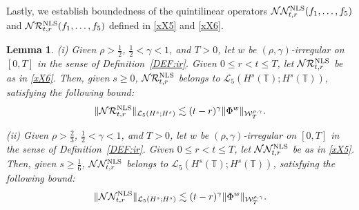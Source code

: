 \documentclass[letterpaper, 11pt,  reqno]{amsart}
\newtheorem{lemma}[theorem]{Lemma}
\newcommand{\1}{\hspace{0.5mm}\text{I}\hspace{0.5mm}}
\newcommand{\noi}{\noindent}
\newcommand{\T}{\mathbb{T}}
\renewcommand{\L}{\mathcal{L}}
\newcommand{\RR}{\mathcal{R}}
\newcommand{\g}{\gamma}
\newcommand{\les}{\lesssim}
\newcommand{\NN}{\mathcal{N}}
\newcommand{\W}{\mathcal{W}}
\newcommand{\NLS}{\text{\rm NLS} }
\numberwithin{equation}{section}
\numberwithin{theorem}{section}
\begin{document}
Lastly,  we establish boundedness of 
the quintilinear operators  
$\NN \NN^\NLS_{t, r}(f_1, \dots, f_5)$
and 
$\NN \RR^\NLS_{t, r}(f_1, \dots, f_5)$
defined in  \eqref{xX5}
and \eqref{xX6}.




\begin{lemma}\label{LEM:nonlin9}
\textup{(i)}
Given $\rho > \frac 12 $,  $\frac12< \g < 1$, and $T> 0$, 
let  $w$ be $(\rho,\g)$-irregular on $[0, T]$ in the sense of Definition~\ref{DEF:ir}.
Given $0 \le r < t \le T$, let $\NN \RR^\NLS_{t, r}$
be as in \eqref{xX6}.
Then, given  $s \ge 0$, 
$\NN \RR^\NLS_{t, r}$  belongs to $\L_5(H^s(\T); H^{s}(\T))$, 
satisfying
 the following bound\textup{:}
\begin{align}
 \|\NN \RR^\NLS_{t, r}\|_{\L_5(H^s; H^{s})}
\les 
(t- r)^\g  \|\Phi^w\|_{  \W^{\rho,\g}_T}.
\label{Xnox1c}
\end{align}




\medskip

\noi
\textup{(ii)}
Given $\rho > \frac 23 $,  $\frac12< \g < 1$, and $T> 0$, 
let  $w$ be $(\rho,\g)$-irregular on $[0, T]$ in the sense of Definition~\ref{DEF:ir}.
Given $0 \le r < t \le T$, let $\NN \NN^\NLS_{t, r}$
be as in \eqref{xX5}.
Then, given  $s \ge \frac 16$, 
$\NN \NN^\NLS_{t, r}$  belongs to $\L_5(H^s(\T); H^{s}(\T))$, 
satisfying
 the following bound\textup{:}
\begin{align}
 \|\NN \NN^\NLS_{t, r}\|_{\L_5(H^s; H^{s})}
\les 
(t- r)^\g  \|\Phi^w\|_{  \W^{\rho,\g}_T}.
\label{Xnox1d}
\end{align}



\end{lemma}
\end{document}
